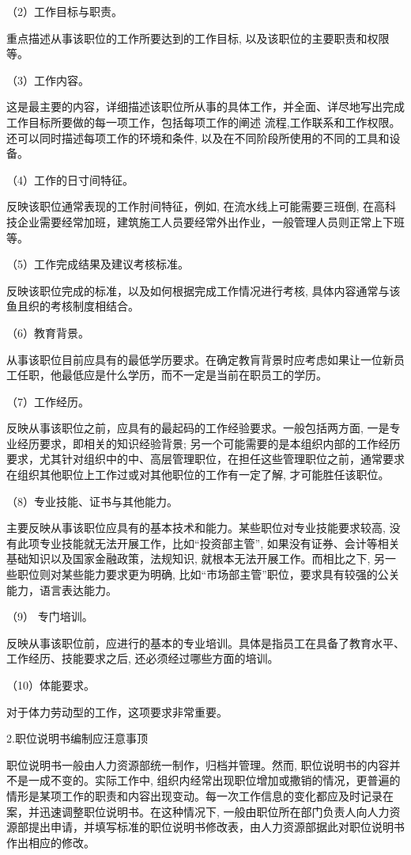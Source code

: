 \documentclass[CJK]{z-article}
\begin{document}
    （2）工作目标与职责。

    重点描述从事该职位的工作所要达到的工作目标, 以及该职位的主要职责和权限等。

    （3）工作内容。

    这是最主要的内容，详细描述该职位所从事的具体工作，并全面、详尽地写出完成工作目标所要做的每一项工作，包括每项工作的阐述 流程,工作联系和工作权限。还可以同时描述每项工作的环境和条件, 以及在不同阶段所使用的不同的工具和设备。

    （4）工作的日寸间特征。

    反映该职位通常表现的工作肘间特征，例如, 在流水线上可能需要三班倒, 在高科技企业需要经常加班，建筑施工人员要经常外出作业，一般管理人员则正常上下班等。

    （5）工作完成结果及建议考核标准。

    反映该职位完成的标准，以及如何根据完成工作情况进行考核, 具体内容通常与该鱼且织的考核制度相结合。

    （6）教育背景。

    从事该职位目前应具有的最低学历要求。在确定教肓背景时应考虑如果让一位新员工任职，他最低应是什么学历，而不一定是当前在职员工的学历。

    （7）工作经历。

    反映从事该职位之前，应具有的最起码的工作经验要求。一般包括两方面, 一是专业经历要求，即相关的知识经验背景; 另一个可能需要的是本组织内部的工作经历要求，尤其针对组织中的中、高层管理职位，在担任这些管理职位之前，通常要求在组织其他职位上工作过或对其他职位的工作有一定了解, 才可能胜任该职位。

    （8）专业技能、证书与其他能力。

    主要反映从事该职位应具有的基本技术和能力。某些职位对专业技能要求较高, 没有此项专业技能就无法开展工作，比如“投资部主管”, 如果没有证券、会计等相关基础知识以及国家金融政策，法规知识, 就根本无法开展工作。而相比之下, 另一些职位则对某些能力要求更为明确, 比如“市场部主管”职位，要求具有较强的公关能力，语言表达能力。

    （9） 专门培训。

    反映从事该职位前，应进行的基本的专业培训。具体是指员工在具备了教育水平、工作经历、技能要求之后, 还必须经过哪些方面的培训。

    （10）体能要求。

    对于体力劳动型的工作，这项要求非常重要。

    2.职位说明书编制应汪意事顶

    职位说明书一般由人力资源部统一制作，归档并管理。然而, 职位说明书的内容并不是一成不变的。实际工作中, 组织内经常出现职位增加或撒销的情况，更普遍的情形是某项工作的职责和内容出现变动。每一次工作信息的变化都应及时记录在案，并迅速调整职位说明书。在这种情况下, 一般由职位所在部门负责人向人力资源部提出申请，并填写标准的职位说明书修改表，由人力资源部据此对职位说明书作出相应的修改。
\end{document}
